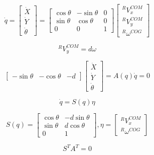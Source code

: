 \begin{equation}
\label{eq:allapot}
\dot{q} = 
\begin{bmatrix}
\dot{X}\\ 
\dot{Y}\\
\dot{\theta}
\end{bmatrix}= \begin{bmatrix}
\cos \theta  & -\sin \theta & 0 \\
\sin\theta & \cos \theta &  0\\ 
 0 & 0  & 1
\end{bmatrix}
\begin{bmatrix}
^RV^{COM}_x\\ 
^RV^{COM}_y\\ 
^R\omega^{COG}
\end{bmatrix}
\end{equation}

\begin{equation}
\label{eq:SebComY}
^RV^{COM}_y = d\omega
\end{equation}

\begin{equation}
\label{eq:nemholomonikusmegkotes}
\begin{bmatrix}
-\sin\theta  & -\cos\theta  & -d
\end{bmatrix}
\begin{bmatrix}
\dot{X}\\ 
\dot{Y}\\
\dot{\theta}
\end{bmatrix} = A(q) \dot{q} =0
\end{equation}

\begin{equation}
    \label{eq:allapotegyszeru}
    \dot q = S(q)\eta 
\end{equation}

\begin{equation*}
S(q)=\begin{bmatrix}
\cos \theta  & -d\sin \theta  \\
\sin\theta & d\cos \theta \\ 
 0  & 1
\end{bmatrix},
\eta=\begin{bmatrix}
^RV^{COM}_x\\ 
^R\omega^{COG}
\end{bmatrix}
\end{equation*}

\begin{equation}
\label{eq:SxAeqZero}
    S^TA^T=0
\end{equation}

